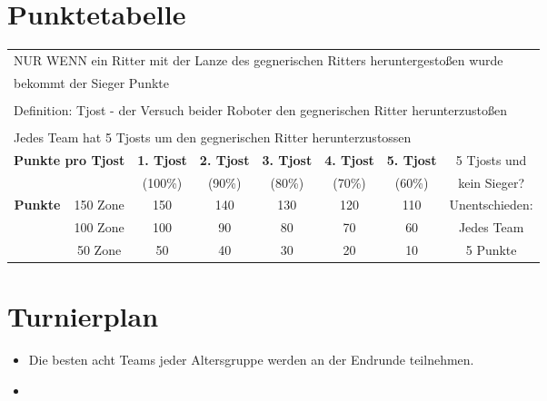 \documentclass[a4paper,12pt]{article}
\begin{document}
\section{Punktetabelle}
\begin{center}
\begin{tabular}{|c|c|c|c|c|c|c|c|} \hline
	\multicolumn{8}{|l|}{NUR WENN ein Ritter mit der Lanze des gegnerischen Ritters heruntergestoßen wurde}\\
	\multicolumn{8}{|l|}{bekommt der Sieger Punkte}\\
	\multicolumn{8}{|l|}{}\\
	\multicolumn{8}{|l|}{Definition: Tjost - der Versuch beider Roboter den gegnerischen Ritter herunterzustoßen}\\
	\multicolumn{8}{|l|}{}\\
	\multicolumn{8}{|l|}{Jedes Team hat 5 Tjosts um den gegnerischen Ritter herunterzustossen} \\ \hline
	\multicolumn{2}{|c|}{\multirow{2}{*}{\textbf{Punkte pro Tjost}}} & \textbf{1. Tjost} & \textbf{2. Tjost} & \textbf{3. Tjost} & \textbf{4. Tjost} & \textbf{5. Tjost} & 5 Tjosts und \\
	\multicolumn{2}{|c|}{}  & (100\%) & (90\%) & (80\%) & (70\%) & (60\%) & kein Sieger? \\
	\cline{1-7}
	\multirow{3}{*}{\textbf{Punkte}} & 150 Zone & 150 & 140 & 130 & 120 & 110 & Unentschieden: \\
	\cline{2-7}
	& 100 Zone & 100 & 90 & 80 & 70 & 60 & Jedes Team \\
	\cline{2-7}
	& 50  Zone& 50 & 40 & 30 & 20 & 10 & 5 Punkte \\
	\hline
\end{tabular}
\end{center}

\pagebreak
\section{Turnierplan}
\begin{itemize}
	\item Die besten acht Teams jeder Altersgruppe werden an der Endrunde
		teilnehmen.
        \item \tournamentQualification
\end{itemize}
\tournamentScoring
\combinedTournament
\end{document}
